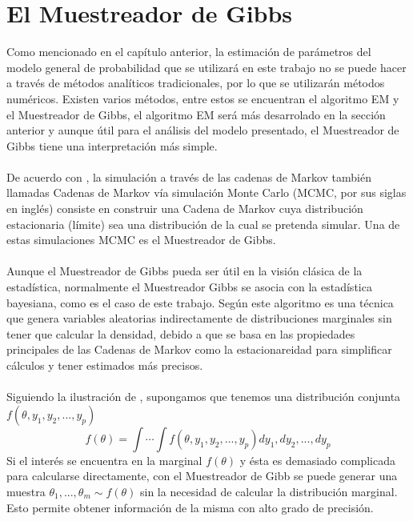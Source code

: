 \section{El Muestreador de Gibbs}
Como mencionado en el cap\'itulo anterior, la estimaci\'on de par\'ametros del modelo general de probabilidad que se utilizar\'a en este trabajo no se puede hacer a trav\'es de m\'etodos anal\'iticos tradicionales, por lo que se utilizar\'an m\'etodos num\'ericos. Existen varios m\'etodos, entre estos se encuentran el algoritmo EM y el Muestreador de Gibbs, el algoritmo EM ser\'a m\'as desarrolado en la secci\'on anterior y aunque \'util para el an\'alisis del modelo presentado, el Muestreador de Gibbs tiene una interpretaci\'on m\'as simple.\\
\\
De acuerdo con \cite{gelman2014bayesian}, la simulaci\'on a trav\'es de las cadenas de Markov tambi\'en llamadas Cadenas de Markov v\'ia simulaci\'on Monte Carlo (MCMC, por sus siglas en ingl\'es) consiste en construir una Cadena de Markov cuya distribuci\'on estacionaria (l\'imite) sea una distribuci\'on de la cual se pretenda simular. Una de estas simulaciones MCMC es el Muestreador de Gibbs.\\
\\
Aunque el Muestreador de Gibbs pueda ser \'util en la visi\'on cl\'asica de la estad\'istica, normalmente el Muestreador Gibbs se asocia con la estad\'istica bayesiana, como es el caso de este trabajo. Seg\'un \cite{casella1992explaining} este algoritmo es una t\'ecnica que genera variables aleatorias indirectamente de distribuciones marginales sin tener que calcular la densidad, debido a que se basa en las propiedades principales de las Cadenas de Markov como la estacionareidad para simplificar c\'alculos y tener estimados m\'as precisos.\\
\\
Siguiendo la ilustraci\'on de \cite{casella1992explaining}, supongamos que tenemos una distribuci\'on conjunta $f(\theta,y_1,y_2,...,y_p)$\\
\[f(\theta)=\int \cdots \int f(\theta,y_1,y_2,...,y_p) dy_1,dy_2,...,dy_p\]
Si el inter\'es se encuentra en la marginal $f(\theta)$ y \'esta es demasiado complicada para calcularse directamente, con el Muestreador de Gibb se puede generar una muestra $\theta_1,...,\theta_m \sim f(\theta)$ sin la necesidad de calcular la distribuci\'on marginal. Esto permite obtener informaci\'on de la misma con alto grado de precisi\'on.\\
\\
